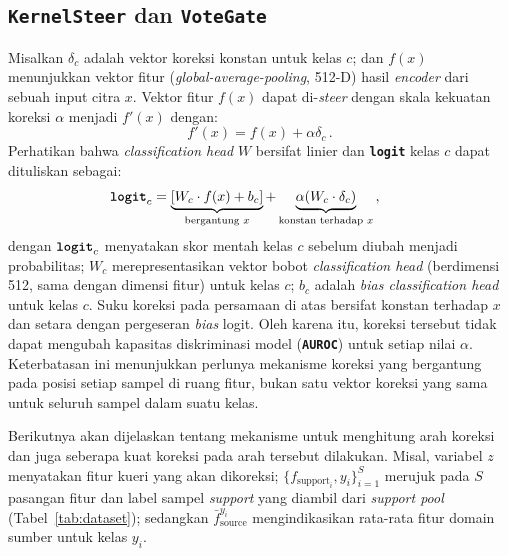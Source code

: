 \documentclass[conference]{IEEEtran}
\newcommand{\nama}[1]{\textbf{\texttt{#1}}}
\begin{document}
\subsection{ \nama{KernelSteer} dan \nama{VoteGate}}
\label{sec:safesteer}
Misalkan $\delta_c$ adalah vektor koreksi konstan untuk kelas $c$; dan $f(x)$ menunjukkan vektor fitur (\textit{global-average-pooling}, 512-D) hasil \textit{encoder} dari sebuah input citra $x$. Vektor fitur $f(x)$ dapat di-\textit{steer} dengan skala kekuatan koreksi $\alpha$ menjadi $f'(x)$ dengan: 
\[
f'(x)=f(x)+\alpha\delta_c \, .
\]
Perhatikan bahwa \textit{classification head} $W$ bersifat linier dan \nama{logit} kelas $c$ dapat dituliskan sebagai:
\begin{equation}
\nama{logit}_c = \underbrace{[W_c\cdot f(x)+b_c]}_{\text{bergantung } x} + \underbrace{\alpha(W_c\cdot\delta_c)}_{\text{konstan terhadap } x} \, ,
\tag*{}\label{eq:limitation}
\end{equation}
dengan $\text{\nama{logit}}_c$ menyatakan skor mentah kelas $c$ sebelum diubah menjadi probabilitas; $W_c$ merepresentasikan vektor bobot \textit{classification head} (berdimensi 512, sama dengan dimensi fitur) untuk kelas $c$; $b_c$ adalah \textit{bias classification head} untuk kelas $c$. Suku koreksi pada persamaan di atas bersifat konstan terhadap $x$ dan setara dengan pergeseran \textit{bias} logit. Oleh karena itu, koreksi tersebut tidak dapat mengubah kapasitas diskriminasi model (\nama{AUROC}) untuk setiap nilai $\alpha$. Keterbatasan ini menunjukkan perlunya mekanisme koreksi yang bergantung pada posisi setiap sampel di ruang fitur, bukan satu vektor koreksi yang sama untuk seluruh sampel dalam suatu kelas.

Berikutnya akan dijelaskan tentang mekanisme untuk menghitung arah koreksi dan juga seberapa kuat koreksi pada arah tersebut dilakukan. Misal, variabel $z$ menyatakan fitur kueri yang akan dikoreksi; $\{f_{\text{support}_i}, y_i\}_{i=1}^{S}$ merujuk pada $S$ pasangan fitur dan label sampel \textit{support} yang diambil dari \textit{support pool} (Tabel~\ref{tab:dataset}); sedangkan $\bar{f}_{\text{source}}^{y_i}$ mengindikasikan rata-rata fitur domain sumber untuk kelas $y_i$.
\end{document}
